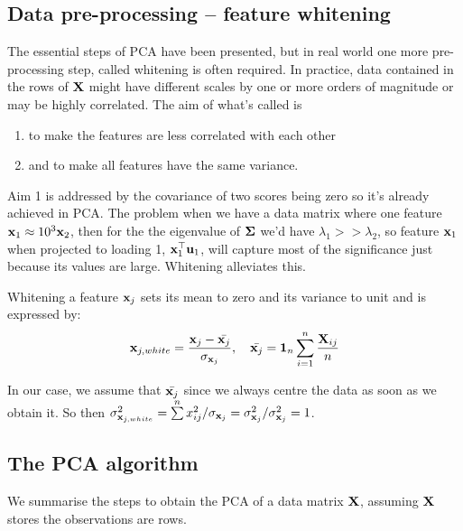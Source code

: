 \documentclass[a4paper]{article}
\begin{document}
\subsection{Data pre-processing -- feature whitening}

The essential steps of PCA have been presented, but in real world one more  pre-processing step, called whitening is often required. In practice, data contained in the rows of $\textbf{X}$ might have different scales by one or more orders of magnitude or may be highly correlated. The aim of what's called  is
\begin{enumerate}
    \item to make the features are less correlated with each other
    \item and to make all features have the same variance.
\end{enumerate}
Aim 1 is addressed by the covariance of two scores being zero so it's already achieved in PCA. The problem when we have a data matrix where one feature $\textbf{x}_1 \approx 10^3 \textbf{x}_2$, then for the the eigenvalue of $\boldsymbol{\Sigma}$ we'd have $\lambda_1 >> \lambda_2$, so feature $\textbf{x}_1$ when projected to loading 1, $\textbf{x}_1^{\top}\textbf{u}_1$, will capture most of the significance just because its values are large. Whitening alleviates this.
\begin{definition}
Whitening a feature $\textbf{x}_j$ sets its mean to zero and its variance to unit and is expressed by:
\begin{equation}
    \textbf{x}_{j,white} = \frac{\textbf{x}_j - \bar{\textbf{x}_j}}{\sigma_{\textbf{x}_j}},\quad \bar{\textbf{x}_j} = \textbf{1}_n\sum\limits_{i=1}^n \frac{\textbf{X}_{ij}}{n}
    \label{eq:data_whiten}
\end{equation}
\end{definition}
In our case, we assume that $ \bar{\textbf{x}_j}$ since we always centre the data as soon as we obtain it. So then $\sigma^2_{\textbf{x}_{j,white}} = \sum\limits^n x_{ij}^2/\sigma_{\textbf{x}_j} = \sigma^2_{\textbf{x}_j}/\sigma^2_{\textbf{x}_j} = 1$.


\subsection{The PCA algorithm}
We summarise the steps to obtain the PCA of a data matrix $\textbf{X}$, assuming $\textbf{X}$ stores the observations are rows.
\end{document}
